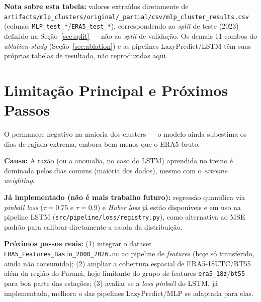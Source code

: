 \documentclass[11pt,a4paper]{article}
\begin{document}
\noindent \textbf{Nota sobre esta tabela:} valores extraídos diretamente de \texttt{artifacts/mlp\_clusters/original/\_partial/csv/mlp\_cluster\_results.csv} (colunas \texttt{MLP\_test\_*}/\texttt{ERA5\_test\_*}), correspondendo ao \textit{split} de teste (2023) definido na Seção~\ref{sec:split} --- não ao \textit{split} de validação. Os demais 11 combos do \textit{ablation study} (Seção~\ref{sec:ablation}) e as pipelines LazyPredict/LSTM têm suas próprias tabelas de resultado, não reproduzidas aqui.

\section{Limitação Principal e Próximos Passos}
O  permanece negativo na maioria dos clusters --- o modelo ainda subestima os dias de rajada extrema, embora bem menos que o ERA5 bruto.

\noindent \textbf{Causa:} A razão  (ou a anomalia, no caso do LSTM) aprendida no treino é dominada pelos dias comuns (maioria dos dados), mesmo com o \textit{extreme weighting}.

\noindent \textbf{Já implementado (não é mais trabalho futuro):} regressão quantílica via \textit{pinball loss} ($\tau=0.75$ e $\tau=0.9$) e \textit{Huber loss} já estão disponíveis e em uso na pipeline LSTM (\texttt{src/pipeline/loss/registry.py}), como alternativa ao MSE padrão para calibrar diretamente a cauda da distribuição.

\noindent \textbf{Próximos passos reais:} (1) integrar o dataset \texttt{ERA5\_Features\_Basin\_2000\_2026.nc} ao pipeline de \textit{features} (hoje só transferido, ainda não consumido); (2) ampliar a cobertura espacial de ERA5-18UTC/BT55 além da região do Paraná, hoje limitante do grupo de features \texttt{era5\_18z}/\texttt{bt55} para boa parte das estações; (3) avaliar se a \textit{loss} \textit{pinball} do LSTM, já implementada, melhora o  das pipelines LazyPredict/MLP se adaptada para elas.
\end{document}
